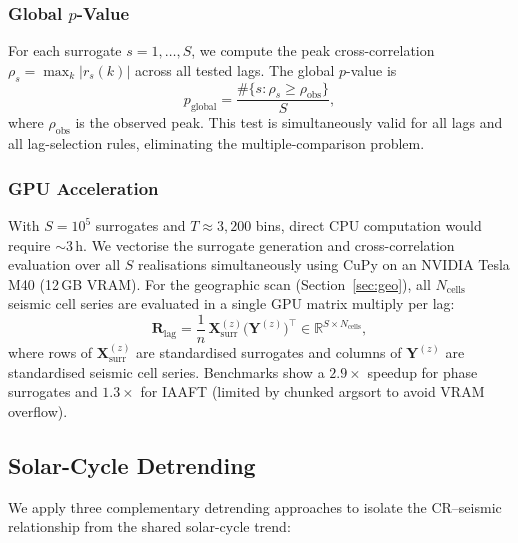 \documentclass[12pt,a4paper]{article}
\begin{document}
\subsubsection{Global $p$-Value}
\label{sec:pvalue}

For each surrogate $s = 1, \ldots, S$, we compute the peak cross-correlation
$\rho_s = \max_k |r_s(k)|$ across all tested lags.
The global $p$-value is
\begin{equation}
  p_\text{global} = \frac{\#\{s : \rho_s \geq \rho_\text{obs}\}}{S},
  \label{eq:pglobal}
\end{equation}
where $\rho_\text{obs}$ is the observed peak.
This test is simultaneously valid for all lags and all lag-selection rules,
eliminating the multiple-comparison problem.

\subsubsection{GPU Acceleration}
\label{sec:gpu}

With $S = 10^5$ surrogates and $T \approx 3{,}200$ bins, direct CPU computation
would require $\sim$3\,h.
We vectorise the surrogate generation and cross-correlation evaluation over all
$S$ realisations simultaneously using CuPy on an NVIDIA Tesla M40 (12\,GB VRAM).
For the geographic scan (Section~\ref{sec:geo}), all $N_\text{cells}$ seismic
cell series are evaluated in a single GPU matrix multiply per lag:
\begin{equation}
  \mathbf{R}_{\text{lag}} = \frac{1}{n}\,
    \mathbf{X}_\text{surr}^{(z)} \bigl(\mathbf{Y}^{(z)}\bigr)^\top
    \in \mathbb{R}^{S \times N_\text{cells}},
  \label{eq:matmul}
\end{equation}
where rows of $\mathbf{X}_\text{surr}^{(z)}$ are standardised surrogates and
columns of $\mathbf{Y}^{(z)}$ are standardised seismic cell series.
Benchmarks show a $2.9\times$ speedup for phase surrogates and $1.3\times$ for IAAFT
(limited by chunked argsort to avoid VRAM overflow).

\subsection{Solar-Cycle Detrending}
\label{sec:detrend}

We apply three complementary detrending approaches to isolate the CR--seismic
relationship from the shared solar-cycle trend:
\end{document}
